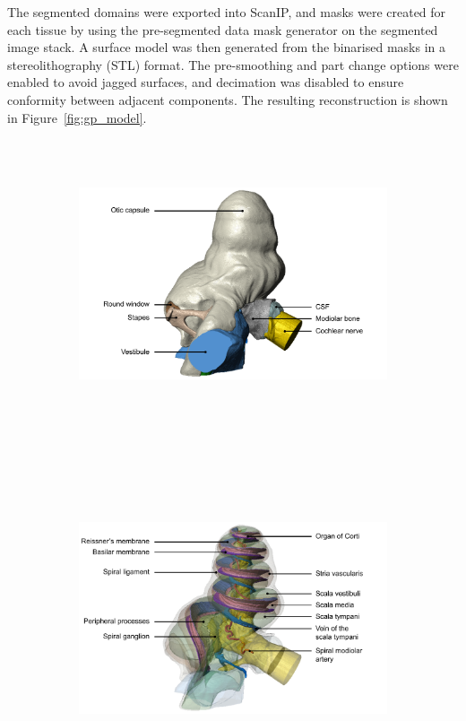 The segmented domains were exported into ScanIP, and masks were created for each
tissue by using the pre-segmented data mask generator on the segmented image
stack. A surface model was then generated from the binarised masks in a
stereolithography (STL) format. The pre-smoothing and part change options were
enabled to avoid jagged surfaces, and decimation was disabled to ensure
conformity between adjacent components. The resulting reconstruction is shown in
Figure~\ref{fig:gp_model}.

\begin{figure}
	\centering
	
	\begin{subfigure}[t]{\textwidth}
        \centering
        \includegraphics[height=8.5cm]{Methodology/cochlea_labelled_opaq}
        \caption{}
        \label{fig:gp_outer}
    \end{subfigure}\\%
    \vspace{1em}%
	\begin{subfigure}[t]{\textwidth}
        \centering
        \includegraphics[height=8.5cm]{Methodology/cochlea_labelled_trans}
        \caption{}
        \label{fig:gp_inner}
    \end{subfigure}%
    

\end{figure}
